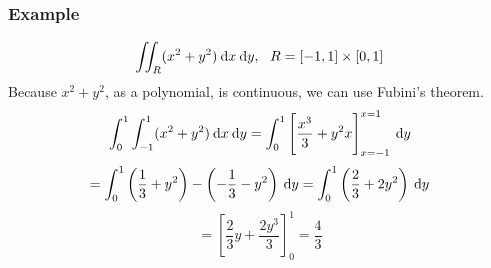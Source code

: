 \documentclass[12pt]{report}
\begin{document}
\begin{flushleft}
\subsubsection*{Example}

\begin{center}
    \[\iint_R(x^2 + y^2)\:\mathrm{d}x\:\mathrm{d}y, \:\:\: R = [-1, 1]\times[0, 1]\]
    Because \(x^2 + y^2\), as a polynomial, is continuous, we can use Fubini's
    theorem.
    \[\int_0^1\int_{-1}^1(x^2 + y^2)\:\mathrm{d}x\:\mathrm{d}y
    = \int_0^1\left[\frac{x^3}{3} + y^2x\right]_{x = -1}^{x = 1}\:\mathrm{d}y\]
    \[= \int_0^1\left(\frac{1}{3} + y^2\right)
    - \left(-\frac{1}{3} - y^2\right)\:\mathrm{d}y = \int_0^1 \left(\frac{2}{3}
    + 2y^2\right) \:\mathrm{d}y\]
    \[= \left[\frac{2}{3}y + \frac{2y^3}{3}\right]_0^1 = \frac{4}{3}\]
\end{center}

\end{flushleft}
\end{document}
